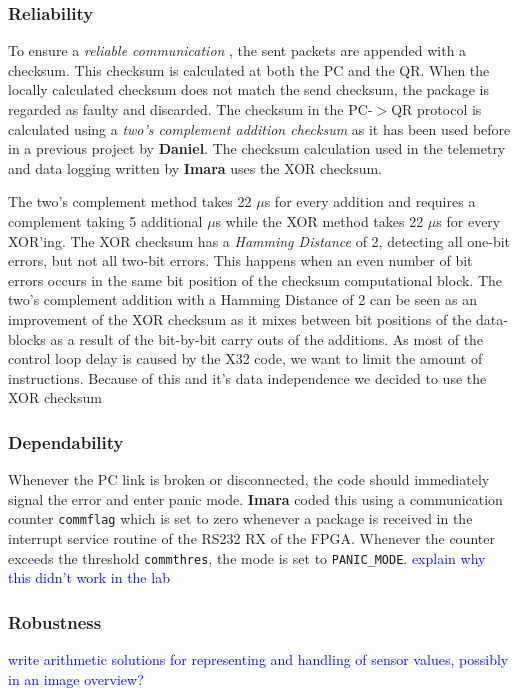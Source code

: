 \documentclass{article}
\newcommand\todo[1]{\textcolor{blue}{#1}} %
\begin{document}
\subsubsection{Reliability} 
To ensure a \emph{reliable communication} , the sent packets are appended with a checksum.  This checksum is calculated at both the PC and the QR. When the locally calculated checksum does not match the send checksum, the package is regarded as faulty and discarded. The checksum in the \textsc{PC-$>$QR} protocol is calculated using a \emph{two's complement addition checksum} as it has been used before in a previous project by \textbf{Daniel}. The checksum calculation used in the telemetry and data logging written by \textbf{Imara} uses the \textsc{XOR} checksum.  

The two's complement method takes 22 $\mu$s for every addition and requires a complement taking 5 additional $\mu$s while the \textsc{XOR} method takes 22 $\mu$s for every \textsc{XOR}'ing. The \textsc{XOR} checksum has a \emph{Hamming Distance} of 2, detecting all one-bit errors, but not all two-bit errors. This happens when an even number of bit errors occurs in the same bit position of the checksum computational block. The two's complement addition with a Hamming Distance of 2 can be seen as an improvement of the \textsc{XOR} checksum as it mixes between bit positions of the data-blocks as a result of the bit-by-bit carry outs of the additions. As most of the control loop delay is caused by the X32 code, we want to limit the amount of instructions. Because of this and it's data independence we decided to use the \textsc{XOR} checksum 

\subsubsection{Dependability}
Whenever the PC link is broken or disconnected, the code should immediately signal the error and enter panic mode. \textbf{Imara} coded this using a communication counter \texttt{commflag} which is set to zero whenever a package is received in the interrupt service routine of the RS232 RX of the FPGA. Whenever the counter exceeds the threshold \texttt{commthres}, the mode is set to \texttt{PANIC\_MODE}. \todo{explain why this didn't work in the lab}

\subsubsection{Robustness}
\todo{write arithmetic solutions for representing and handling of sensor values, possibly in an image overview?}
\end{document}

